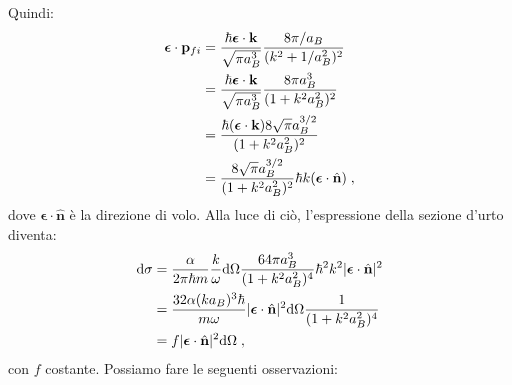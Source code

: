 \documentclass[10pt,a4paper]{report}
\theoremstyle{definition}
\numberwithin{equation}{section}
\newcommand{\diff}[1][]{\mathrm{d}#1}
\begin{document}
Quindi:
\begin{align}
\boldsymbol{\epsilon}\cdot\mathbf{p}_{fi} &= \frac{\hbar\boldsymbol{\epsilon}\cdot\mathbf{k}}{\sqrt{\pi a_B^3}}\frac{8\pi/a_B}{(k^2+1/a_B^2)^2} \notag \\
&= \frac{\hbar\boldsymbol{\epsilon}\cdot\mathbf{k}}{\sqrt{\pi a_B^3}}\frac{8\pi a_B^3}{(1+k^2a_B^2)^2} \notag \\
&= \frac{\hbar(\boldsymbol{\epsilon}\cdot\mathbf{k})8\sqrt{\pi}a_B^{3/2}}{(1+k^2a_B^2)^2} \notag \\
&=\frac{8\sqrt{\pi}a_B^{3/2}}{(1+k^2a_B^2)^2}\hbar k(\boldsymbol{\epsilon}\cdot\hat{\mathbf{n}})\;,
\end{align}
dove $\boldsymbol{\epsilon}\cdot\hat{\mathbf{n}}$ è la direzione di volo. Alla luce di ciò, l'espressione della sezione d'urto diventa:
\begin{align}
\diff{\sigma} &= \frac{\alpha}{2\pi\hbar m}\frac{k}{\omega}\diff{\Omega}\frac{64\pi a_B^3}{(1+k^2a_B^2)^4}\hbar^2k^2|\boldsymbol{\epsilon}\cdot\hat{\mathbf{n}}|^2 \notag \\
&= \frac{32\alpha (ka_B)^3\hbar}{m\omega}|\boldsymbol{\epsilon}\cdot\hat{\mathbf{n}}|^2\diff{\Omega}\frac{1}{(1+k^2a_B^2)^4} \notag \\
&= f|\boldsymbol{\epsilon}\cdot\hat{\mathbf{n}}|^2\diff{\Omega}\;,
\end{align}
con $f$ costante. Possiamo fare le seguenti osservazioni:
\end{document}
